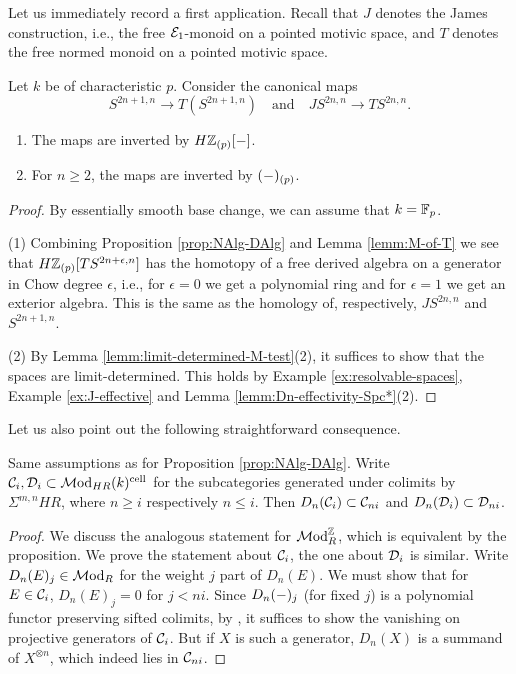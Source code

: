 \documentclass{amsart}
\renewcommand{\NB}[1]{}
\numberwithin{proposition}{section}
\numberwithin{equation}{section}
\def\cell{\mathrm{cell}}
\begin{document}
Let us immediately record a first application.
Recall that $J$ denotes the James construction, i.e., the free $\mathcal E_1$-monoid on a pointed motivic space, and $T$ denotes the free normed monoid on a pointed motivic space.
\begin{corollary} \label{cor:identify-J-T}
Let $k$ be of characteristic $p$.
Consider the canonical maps \[ S^{2n+1,n} \to T(S^{2n+1,n}) \quad\text{and}\quad JS^{2n,n} \to TS^{2n,n}. \]
\begin{enumerate}
\item The maps are inverted by $H\mathbb{Z}_{(p)}[\mathord-]$.
\item For $n \ge 2$, the maps are inverted by $(\mathord-)_{(p)}$.\NB{in fact $n \ge 1$ works}
\end{enumerate}
\end{corollary}
\begin{proof}
By essentially smooth base change\NB{details?}, we can assume that $k=\mathbb{F}_p$.

(1) Combining Proposition \ref{prop:NAlg-DAlg} and Lemma \ref{lemm:M-of-T} we see that $H\mathbb{Z}_{(p)}[TS^{2n+\epsilon,n}]$ has the homotopy of a free derived algebra on a generator in Chow degree $\epsilon$, i.e., for $\epsilon = 0$ we get a polynomial ring and for $\epsilon = 1$ we get an exterior algebra.
This is the same as the homology of, respectively, $JS^{2n,n}$ and $S^{2n+1,n}$.

(2) By Lemma \ref{lemm:limit-determined-M-test}(2), it suffices to show that the spaces are limit-determined.
This holds by Example \ref{ex:resolvable-spaces}, Example \ref{ex:J-effective} and Lemma \ref{lemm:Dn-effectivity-Spc*}(2).
\end{proof}

Let us also point out the following straightforward consequence.
\begin{lemma} \label{lemm:Dn-weights}
Same assumptions as for Proposition \ref{prop:NAlg-DAlg}.\NB{statement about $\scr C_i$ holds much more generally}
Write $\scr C_i, \scr D_i \subset \Mod_{HR}(k)^\cell$ for the subcategories generated under colimits by $\Sigma^{m,n}HR$, where $n \ge i$ respectively $n \le i$.
Then $D_n(\mathcal C_i) \subset \mathcal C_{ni}$ and $D_n(\mathcal D_i) \subset \mathcal D_{ni}$.
\end{lemma}
\begin{proof}
We discuss the analogous statement for $\mathcal{M}\mathrm{od}_R^{\mathbb{Z}}$, which is equivalent by the proposition.
We prove the statement about $\scr C_i$, the one about $\mathcal D_i$ is similar.
Write $D_n(E)_j \in \mathcal{M}\mathrm{od}_R$ for the weight $j$ part of $D_n(E)$.
We must show that for $E \in \mathcal C_i$, $D_n(E)_j = 0$ for $j < ni$.
Since $D_n(\mathord-)_j$ (for fixed $j$) is a polynomial functor preserving sifted colimits, by \cite[Proposition 4.2.15]{raksit2020hochschild}, it suffices to show the vanishing on projective generators of $\scr C_i$.
But if $X$ is such a generator, $D_n(X)$ is a summand of $X^{\otimes n}$, which indeed lies in $\mathcal C_{ni}$.
\end{proof}
\end{document}
